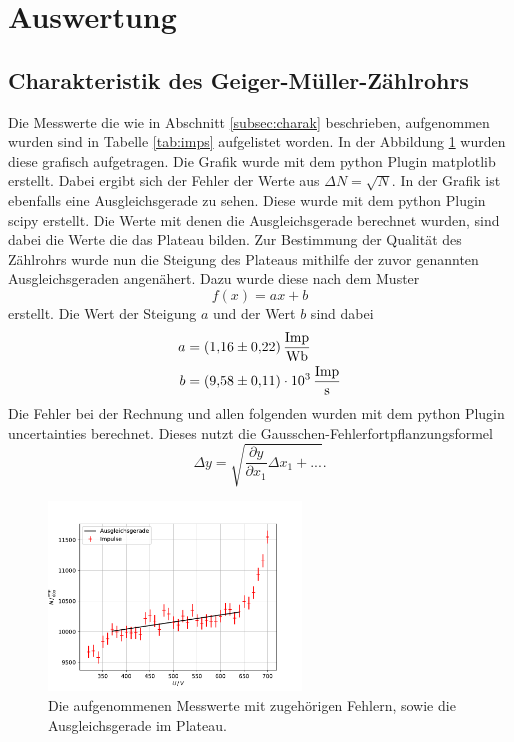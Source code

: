 \section{Auswertung}
\label{sec:Auswertung}
\subsection{Charakteristik des Geiger-Müller-Zählrohrs}
\label{subsec:auscharak}
Die Messwerte die wie in Abschnitt \ref{subsec:charak} beschrieben, aufgenommen wurden sind in Tabelle \ref{tab:imps} aufgelistet worden.
In der Abbildung \ref{fig:imps} wurden diese grafisch aufgetragen.
Die Grafik wurde mit dem python Plugin matplotlib \cite{matplotlib} erstellt.
Dabei ergibt sich der Fehler der Werte aus $\Delta N = \sqrt{N}$.
In der Grafik  ist ebenfalls eine Ausgleichsgerade zu sehen.
Diese wurde mit dem python Plugin scipy \cite{scipy} erstellt.
Die Werte mit denen die Ausgleichsgerade berechnet wurden, sind dabei die Werte die das Plateau bilden.
Zur Bestimmung der Qualität des Zählrohrs wurde nun die Steigung des Plateaus mithilfe der zuvor genannten Ausgleichsgeraden angenähert.
Dazu wurde diese nach dem Muster 
\begin{equation*}
  f(x) = ax +b 
\end{equation*} 
erstellt.
Die Wert der Steigung $a$ und der Wert $b$ sind dabei
\begin{align*}
  a &= \SI{1.16(22)}{\frac{\text{Imp}}{\weber}} \\
  b &= \SI{9.58(11)e03}{\frac{\text{Imp}}{\second}}\\
\end{align*}
Die Fehler bei der Rechnung und allen folgenden wurden mit dem python Plugin uncertainties \cite{uncertainties} berechnet.
Dieses nutzt die Gausschen-Fehlerfortpflanzungsformel 
\begin{equation*}
  \Delta y = \sqrt{\frac{\partial y}{\partial x_1}\Delta x_1+...}.
\end{equation*}

\begin{figure}
  \centering
  \includegraphics[width=0.6\textwidth]{content/data/kennlinie.pdf}
  \caption{Die aufgenommenen Messwerte mit zugehörigen Fehlern, sowie die Ausgleichsgerade im Plateau.}
  \label{fig:imps}
\end{figure}

